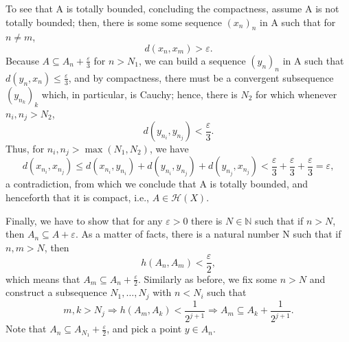 \documentclass[../fractals_everywhere.tex]{subfiles}
\begin{document}
\begin{proof*}
	To see that A is totally bounded, concluding the compactness, assume A is not totally bounded; then, there is some some sequence \((x_{n})_{n}\) in A such that for \(n\neq m\),
	\[
		d(x_{n}, x_{m}) > \varepsilon .
	\]
	Because \(\displaystyle A\subseteq A_{n}+ \frac{\varepsilon }{3}\) for \(n > N_1\), we can build a sequence \((y_{n})_{n}\) in A such that \(\displaystyle d(y_{n}, x_{n}) \leq  \frac{\varepsilon }{3}\), and by compactness, there must be a convergent subsequence \((y_{n_{k}})_{k}\) which, in particular, is Cauchy; hence, there is \(N_{2}\) for which whenever \(n_{i}, n_{j} > N_2\),
	\[
		d(y_{n_i}, y_{n_{j}}) < \frac{\varepsilon }{3}.
	\]
	Thus, for \(n_{i}, n_{j} > \max\limits_{}(N_1, N_2)\), we have
	\[
		d(x_{n_i},x_{n_{j}}) \leq d(x_{n_{i}}, y_{n_{i}}) + d(y_{n_{i}}, y_{n_{j}}) + d(y_{n_{j}}, x_{n_{j}}) < \frac{\varepsilon }{3} + \frac{\varepsilon }{3} + \frac{\varepsilon }{3} = \varepsilon ,
	\]
	a contradiction, from which we conclude that A is totally bounded, and henceforth that it is compact, i.e., \(A\in \mathcal{H}(X)\).

	Finally, we have to show that for any \(\varepsilon > 0\) there is \(N\in \mathbb{N}\) such that if \(n > N\), then \(A_{n}\subseteq A+\varepsilon \). As a matter of facts, there is a natural number N such that if \(n, m >N\), then
	\[
		h(A_{n}, A_{m}) < \frac{\varepsilon }{2},
	\]
	which means that \(\displaystyle A_{m} \subseteq A_{n}+ \frac{\varepsilon }{2}\). Similarly as before, we fix some \(n > N\) and construct a subsequence \(N_1, \dotsc , N_{j}\) with \(n < N_{i}\) such that
	\[
		m, k > N_{j} \Rightarrow h(A_{m}, A_{k}) < \frac{1}{2^{j+1}} \Rightarrow A_{m} \subseteq A_{k} + \frac{1}{2^{j+1}}.
	\]
	Note that \(A_{n}\subseteq A_{N_1} + \frac{\varepsilon }{2}\), and pick a point \(y\in A_{n}\).
\end{proof*}
\end{document}
